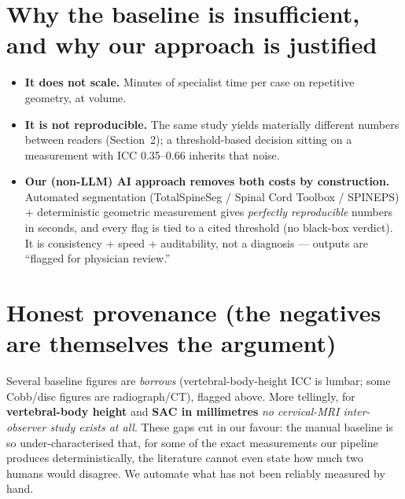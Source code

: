 \documentclass[11pt]{article}
\begin{document}
\section{Why the baseline is insufficient, and why our approach is justified}
\begin{itemize}
  \item \textbf{It does not scale.} Minutes of specialist time per case on repetitive geometry, at volume.
  \item \textbf{It is not reproducible.} The same study yields materially different numbers between
  readers (Section~2); a threshold-based decision sitting on a measurement with ICC 0.35--0.66 inherits
  that noise.
  \item \textbf{Our (non-LLM) AI approach removes both costs by construction.} Automated segmentation
  (TotalSpineSeg / Spinal Cord Toolbox / SPINEPS) + deterministic geometric measurement gives
  \emph{perfectly reproducible} numbers in seconds, and every flag is tied to a cited threshold (no
  black-box verdict). It is consistency + speed + auditability, not a diagnosis --- outputs are
  ``flagged for physician review.''
\end{itemize}

\section{Honest provenance (the negatives are themselves the argument)}
Several baseline figures are \emph{borrows} (vertebral-body-height ICC is lumbar; some Cobb/disc figures
are radiograph/CT), flagged above. More tellingly, for \textbf{vertebral-body height} and \textbf{SAC in
millimetres} \emph{no cervical-MRI inter-observer study exists at all}. These gaps cut in our favour: the
manual baseline is so under-characterised that, for some of the exact measurements our pipeline produces
deterministically, the literature cannot even state how much two humans would disagree. We automate what
has not been reliably measured by hand.
\end{document}
